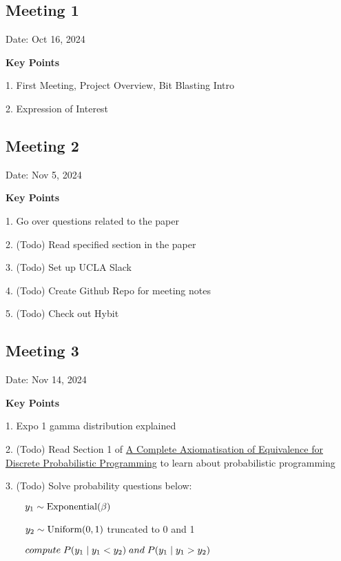 \documentclass[12pt]{article}
\begin{document}
\subsection*{Meeting 1}
Date: Oct 16, 2024

\textbf{Key Points} 

1. First Meeting, Project Overview, Bit Blasting Intro  

2. Expression of Interest 


\subsection*{Meeting 2}
Date: Nov 5, 2024

\textbf{Key Points} 

1. Go over questions related to the paper 

2. (Todo) Read specified section in the paper 

3. (Todo) Set up UCLA Slack

4. (Todo) Create Github Repo for meeting notes

5. (Todo) Check out Hybit


\subsection*{Meeting 3}
Date: Nov 14, 2024

\textbf{Key Points} 

1. Expo 1 gamma distribution explained

2. (Todo) Read Section 1 of \href{https://arxiv.org/pdf/2408.14701}{A Complete Axiomatisation of Equivalence for Discrete
Probabilistic Programming} to learn about probabilistic programming

3. (Todo) Solve probability questions below:

$ \hspace*{2em} y_1 \sim \text{Exponential}(\beta)$

$ \hspace*{2em} y_2 \sim \text{Uniform}(0,1)$ truncated to 0 and 1

$ \hspace*{2em} compute\; P(y_1  \mid y_1 < y_2) \; and \; P(y_1 \mid y_1 > y_2)$
\end{document}
